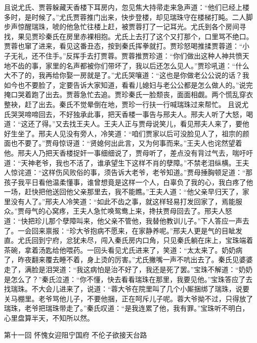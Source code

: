 \documentclass[12pt,oneside]{book}
\begin{document}
且说尤氏、贾蓉躲藏天香楼下耳房内，忽见焦大持帚走来急声道：“他们已经上楼多时，是时候了。”尤氏贾蓉推门出来，快步登楼，却见瑞珠守在楼梯打盹。二人脚步声惊醒瑞珠，唬的他急忙往楼上赶，被贾蓉打了一记耳光。尤氏到各个房间寻找，果见贾珍秦氏在房里赤裸相抱。尤氏上去打了这个又打那个，口里骂不绝口。贾蓉也窜了进来，看见这番丑态，按到秦氏挥拳就打。贾珍怒喝推揉贾蓉道：“小子无礼，还不住手。”反挥手去打贾蓉。贾蓉推贾珍道：“你们做出这种人神共愤天地不齿的事，家里的名声都被你们带坏了，我以后还怎么见人。”贾珍吼道：“什么大不了的，我再给你娶一房就是了。”尤氏哭嚷道：“这也是你做老公公说的话？我如今也不要脸了，定要告诉大家知道，看看儿媳妇与老公公都是怎么做人的。”说完掩口哭着跑了出去。贾蓉急忙去追。贾珍秦氏一脸颓丧，面面相觑。两个慌乱穿衣整袂，赶了出去。秦氏不觉晕倒在地，贾珍一行扶一行喊瑞珠过来帮忙。
且说尤氏哭哭啼啼回去，不好独承此事，把天香楼一事告与邢夫人。邢夫人听了大怒，喝道：“这还了得。”又去找王夫人。王夫人正与贾母说笑儿，看见邢夫人来了，要他好生坐了。邢夫人见没有旁人，冷笑道：“咱们贾家以后可没脸见人了，祖宗的颜面也不要了。”贾母惊讶道：“贤媳何出此言，又为何事而来。”王夫人也诧然望着他。邢夫人乃把天香楼捉奸一事细细说了，贾母听了，差点没有背过气去，喘吁吁道：“天神老爷，我也不活了，谁承望生下这样不肖的孽障。”不禁老泪纵横。王夫人惊诧道：“这样伤风败俗的事，须告诉大老爷，老爷知道。”贾母捶胸顿足道：“那孩子我平日看他温柔懂事，谁曾想竟是这样一个人，白辜负了我的心，我白疼了他一场，赶快把他送回他父亲那里去，我不能瞧。”王夫人道：“他父亲早归天了，家里没有人了。”邢夫人冷笑道：“如此不齿之事，就这样轻易打发回家了，焉能服众。”贾母气的心窝疼，王夫人急忙唤鸳鸯上来，搀扶贾母回去了。邢夫人怒道：“快把珍儿那个孽障叫来，他父亲不管他，我替他教训儿子。”下人答应一声去了。一会回来禀报：“珍大爷抱病不愿来，在家静养呢。”邢夫人更是气的目眦发直。尤氏回到宁府，忿犹未尽，闯入秦氏房内口角，只见秦氏躺在床上，宝珠端着茶碗，拿着汤匙给他喂药。一回头看见尤氏进来了，笑道：“太太来了。奶奶病了，昨夜翻来覆去睡不着，身上烫的厉害。”尤氏撇嘴一声不吭出去了。秦氏见婆婆走了，满脸是泪哭道：“我这病怕是治不好了，我还是死了罢。”宝珠不解道：“奶奶是怎么了？”秦氏泣道：“你不懂，快去看看瑞珠在那里，我要见他。”宝珠答应了去找瑞珠。不大会儿进来了，说道：“蓉大爷在院里叫了几个小厮捆绑了瑞珠，说要关马棚里。老爷骂他儿子，不要他捆，正在呵斥儿子呢。蓉大爷拗不过，只得放了瑞珠，老爷把瑞珠带走了。”秦氏叹道：“是我连累了他，我有罪。”宝珠听不明白，心里盘算半天，不知所以然。


 

第十一回 怀愧女迎阻宁国府 不伦子欲接天台路
\end{document}
